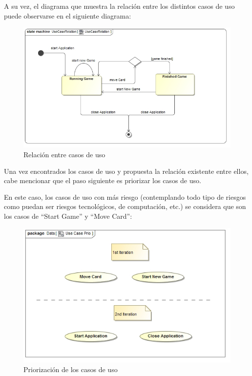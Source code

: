 \documentclass[11pt]{article}
\begin{document}
A su vez, el diagrama que muestra la relación entre los distintos casos de uso puede observarse en el siguiente diagrama:

\begin{center}
 \begin{figure}[H]
 \begin{center}
   \includegraphics[width=16cm]{DomainModel/UseCaseRelation00.jpg}
   \caption{Relación entre casos de uso}
   \label{fig:usecaserelation}
 \end{center}
 \end{figure}
\end{center}

Una vez encontrados los casos de uso y propuesta la relación existente entre ellos, cabe mencionar que el paso siguiente es priorizar los casos de uso.

En este caso, los casos de uso con más riesgo (contemplando todo tipo de riesgos como puedan ser riesgos tecnológicos, de computación, etc.) se considera que son los casos de ``Start Game'' y ``Move Card'':

\begin{center}
 \begin{figure}[H]
 \begin{center}
   \includegraphics[width=15cm]{DomainModel/UseCasePrio00.jpg}
   \caption{Priorización de los casos de uso}
   \label{fig:usecasepriorization}
 \end{center}
 \end{figure}
\end{center}
\end{document}
